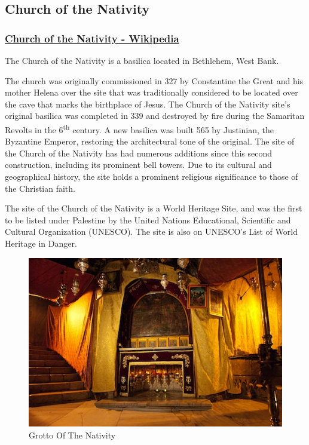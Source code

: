 \documentclass[letterpaper]{report}
\begin{document}
\subsection{Church of the Nativity}
\begin{multicols}{2}

\subsubsection{\href{https://en.wikipedia.org/wiki/Church_of_the_Nativity}{
Church of the Nativity - Wikipedia}}

The Church of the Nativity is a basilica located in Bethlehem, West Bank.

The church was originally commissioned in 327 by Constantine the Great and his 
mother Helena over the site that was traditionally considered to be located 
over the cave that marks the birthplace of Jesus.
The Church of the Nativity site's original basilica was completed in 339 and 
destroyed by fire during the Samaritan Revolts in the 6\textsuperscript{th} century.
A new basilica was built 565 by Justinian, the Byzantine Emperor,
restoring the architectural tone of the original.
The site of the Church of the Nativity has had numerous additions since this 
second construction, including its prominent bell towers.
Due to its cultural and geographical history,
the site holds a prominent religious significance to those of the Christian faith.

The site of the Church of the Nativity is a World Heritage Site,
and was the first to be listed under Palestine by the United Nations Educational,
Scientific and Cultural Organization (UNESCO). The site is also on UNESCO's List of World Heritage in Danger.

\begin{figure}[H]
\centering
\label{fig:GrottoOfTheNativity}
\caption{Grotto Of The Nativity}
\includegraphics[width=\columnwidth]{GrottoOfTheNativity}
\end{figure}


\end{multicols}
\end{document}
